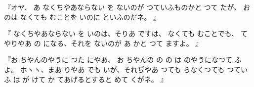 『オヤ、
あ
なくちやあならない
を
ないのが
つていふものかと
つて
たが、
お
のは
なくても
むことを
いのに
といふのだネ。
』

『
なくちやあならない
を
いのは、そりあ
ですは、
なくても
むことでも、
てやりやあ
の
になる、それを
ないのが
あ
かと
つて
ますよ。
』

『お
ちやんのやうに
つた
にやあ、
お
ちやんの
の
の
は
のやうになつて
ふよ。
ホヽヽ、まあ
りやあ
でも
いが、それぢやあ
つても
らなくつても
つていふ
は
が
けて
か
てあげるとすると
めて
くがネ。
』

